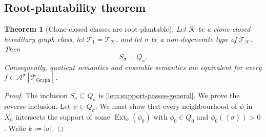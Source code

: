 \documentclass[11pt]{article}
\newtheorem{theorem}{Theorem}
\theoremstyle{definition}
\newcommand{\A}{\mathcal{A}}
\newcommand{\K}{\mathcal{K}}
\newcommand{\T}{\mathcal{T}}
\newcommand{\Ext}{\operatorname{Ext}}
\newcommand{\brak}[1]{\left\langle #1\right\rangle}
\begin{document}
\subsection{Root-plantability theorem}

\begin{theorem}[Clone-closed classes are root-plantable]\label{thm:clone-root-plantable}
Let $\K$ be a clone-closed hereditary graph class, let
$\T_1=\T_\K$, and let $\sigma$ be a non-degenerate type of $\T_\K$.  Then
\[
  S_\sigma=Q_\sigma.
\]
Consequently, quotient semantics and ensemble semantics are equivalent for every
$f\in\A^\sigma[\T_{\mathrm{Graph}}]$.
\end{theorem}

\begin{proof}
The inclusion $S_\sigma\subseteq Q_\sigma$ is \cref{lem:support-passes-general}.
We prove the reverse inclusion.  Let $\psi\in Q_\sigma$.  We must show that every
neighbourhood of $\psi$ in $X_\sigma$ intersects the support of some
$\Ext_\sigma(\phi_0)$ with $\phi_0\in Q_0$ and $\phi_0(\brak\sigma)>0$.  Write
$k:=|\sigma|$.


\end{proof}
\end{document}
